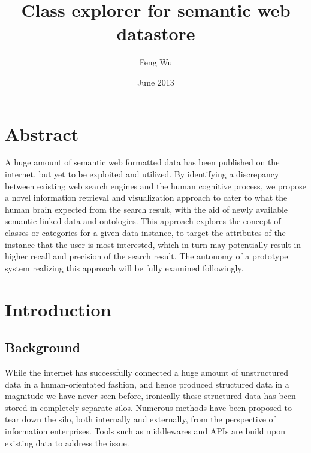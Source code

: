 \documentclass[12pt]{cls}
\title{Class explorer for semantic web datastore}
\author{Feng Wu}
\date{June 2013}
\begin{document}
\muntitlepage

\setcounter{secnumdepth}{3} \setcounter{tocdepth}{3}

 \setcounter{page}{0}

\doublespacing
\setlength{\topmargin}{-.5in}

\chapter*{Abstract}
A huge amount of semantic web formatted data has been published on the internet, but yet to be exploited and utilized. By identifying a discrepancy between existing web search engines and the human cognitive process, we propose a novel information retrieval and visualization approach to cater to what the human brain expected from the search result, with the aid of newly available semantic linked data and ontologies. This approach explores the concept of classes or categories for a given data instance, to target the attributes of the instance that the user is most interested, which in turn may potentially result in higher recall and precision of the search result. The autonomy of a prototype system realizing this approach will be fully examined followingly.



\renewcommand{\contentsname}{Table of Contents}
\tableofcontents{}

\doublespacing
\clearpage

\chapter{Introduction}
\setcounter{secnumdepth}{3} 
\pagestyle{myheadings}
\markboth{}{}\markright{} \rhead{\thepage} 
\pagestyle{myheadings} \rhead{\thepage}


\section{Background}

While the internet has successfully connected a huge amount of unstructured data in a human-orientated fashion, and hence produced structured data in a magnitude we have never seen before, ironically these structured data has been stored in completely separate silos. Numerous methods have been proposed to tear down the silo, both internally and externally, from the perspective of information enterprises. Tools such as middlewares and APIs are build upon existing data to address the issue.
\end{document}
